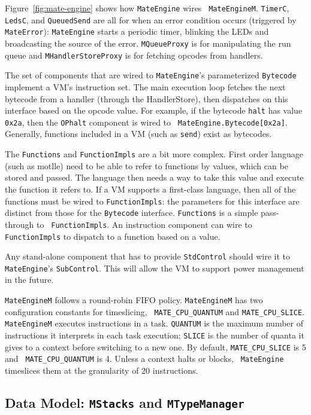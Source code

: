 \documentclass[12pt]{article}
\begin{document}
Figure~\ref{fig:mate-engine} shows how {\tt MateEngine} wires {\tt
MateEngineM}. {\tt TimerC}, {\tt LedsC}, and {\tt QueuedSend} are all
for when an error condition occurs (triggered by {\tt MateError}):
{\tt MateEngine} starts a periodic timer, blinking the LEDs and
broadcasting the source of the error. {\tt MQueueProxy} is for
manipulating the run queue and {\tt MHandlerStoreProxy} is for
fetching opcodes from handlers.

The set of components that are wired to {\tt MateEngine}'s
parameterized {\tt Bytecode} implement a VM's instruction set. The
main execution loop fetches the next bytecode from a handler (through
the HandlerStore), then dispatches on this interface based on the
opcode value. For example, if the bytecode {\tt halt} has value {\tt
0x2a}, then the {\tt OPhalt} component is wired to {\tt
MateEngine.Bytecode[0x2a]}. Generally, functions included in a VM
(such as {\tt send}) exist as bytecodes.

The {\tt Functions} and {\tt FunctionImpls} are a bit more
complex. First order language (such as motlle) need to be able to
refer to functions by values, which can be stored and passed. The
language then needs a way to take this value and execute the function
it refers to. If a VM supports a first-class language, then all of the
functions must be wired to {\tt FunctionImpls}: the parameters for
this interface are distinct from those for the {\tt Bytecode}
interface. {\tt Functions} is a simple pass-through to {\tt
FunctionImpls}. An instruction component can wire to {\tt
FunctionImpls} to dispatch to a function based on a value.

Any stand-alone component that has to provide {\tt StdControl} should
wire it to {\tt MateEngine}'s {\tt SubControl}. This will allow the VM
to support power management in the future.

{\tt MateEngineM} follows a round-robin FIFO policy. {\tt MateEngineM}
has two configuration constants for timeslicing, {\tt
MATE\_CPU\_QUANTUM} and {\tt MATE\_CPU\_SLICE}. {\tt MateEngineM}
executes instructions in a task. {\tt QUANTUM} is the maximum number
of instructions it interprets in each task execution; {\tt SLICE} is
the number of quanta it gives to a context before switching to a new
one. By default, {\tt MATE\_CPU\_SLICE} is 5 and {\tt
MATE\_CPU\_QUANTUM} is 4. Unless a context halts or blocks, {\tt
MateEngine} timeslices them at the granularity of 20 instructions.

\subsection{Data Model: {\tt MStacks} and {\tt MTypeManager}}
\end{document}
